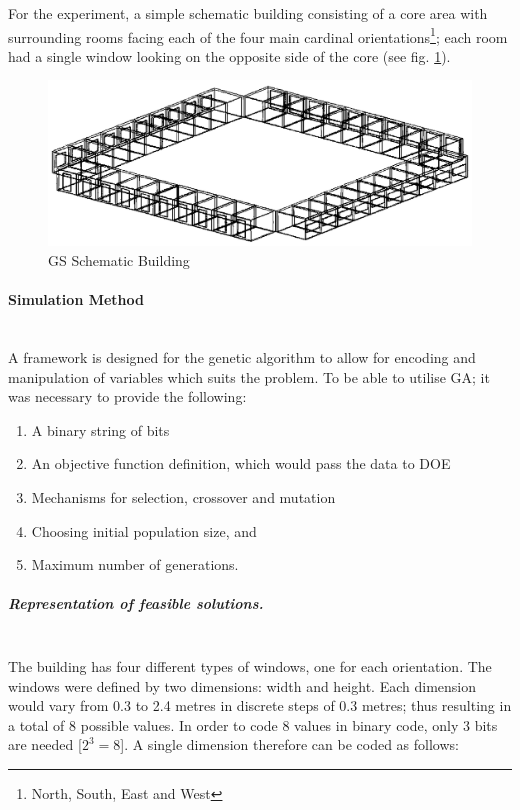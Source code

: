 For the experiment, a simple schematic building consisting of a core area with surrounding rooms facing each of the four main cardinal orientations\footnote{North, South, East and West}; each room had a single window looking on the opposite side of the core (see fig. \ref{fig:SchmBuild}).

\begin{figure}[htbp]
\centering
\includegraphics[width=\textwidth]{./Images/16-SchematicBuilding}
\caption[GS Schematic Building]{GS Schematic Building \cite{caldas01}}
\label{fig:SchmBuild}
\end{figure}

\paragraph{Simulation Method}\mbox{}\\

A framework is designed for the genetic algorithm to allow for encoding and manipulation of variables which suits the problem. To be able to utilise GA; it was necessary to provide the following:
\begin{enumerate}[nolistsep]
\item A binary string of bits
\item An objective function definition, which would pass the data to DOE
\item Mechanisms for selection, crossover and mutation
\item Choosing initial population size, and
\item Maximum number of generations.
\end{enumerate}

\subparagraph{Representation of feasible solutions.}\mbox{}\\

The building has four different types of windows, one for each orientation. The windows were defined by two dimensions: width and height. Each dimension would vary from 0.3 to 2.4 metres in discrete steps of 0.3 metres; thus resulting in a total of 8 possible values. In order to code 8 values in binary code, only 3 bits are needed [$2^3=8$]. A single dimension therefore can be coded as follows:

